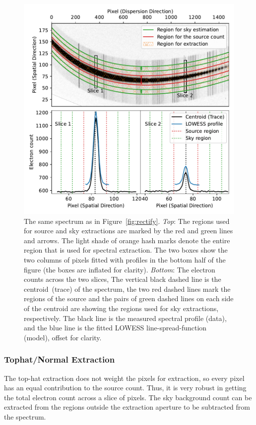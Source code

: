 \documentclass[linenumbers, twocolumn]{aastex631}
\begin{document}
\begin{figure}
    \centering
    \includegraphics[width=\columnwidth]{fig_03_extraction_profile.pdf}
    \caption{The same spectrum as in Figure~\ref{fig:rectify}. \textit{Top}:
    The regions used for source and sky extractions are marked
    by the red and green lines and arrows. The light shade of orange
    hash marks denote the entire region that is used for spectral extraction.
    The two boxes show the two columns of pixels fitted with
    profiles in the bottom half of the figure (the boxes are inflated
    for clarity). \textit{Bottom}: The electron counts across the two slices,
    The vertical black dashed line is the centroid~(trace) of the spectrum,
    the two red dashed lines mark the regions of the source and the
    pairs of green dashed lines on each side of the centroid are
    showing the regions used for sky extractions, respectively. The
    black line is the measured spectral profile (data), and the blue
    line is the fitted LOWESS line-spread-function (model), offset for
    clarity.}
    \label{fig:extraction}
\end{figure}

\subsubsection*{Tophat/Normal Extraction}
\label{sec:tophat}
The top-hat extraction does not weight the pixels for extraction,
so every pixel has an equal contribution to the source count. Thus,
it is very robust in getting the total electron count across
a slice of pixels. The sky background count can be extracted
from the regions outside the extraction aperture to be
subtracted from the spectrum.
\end{document}
